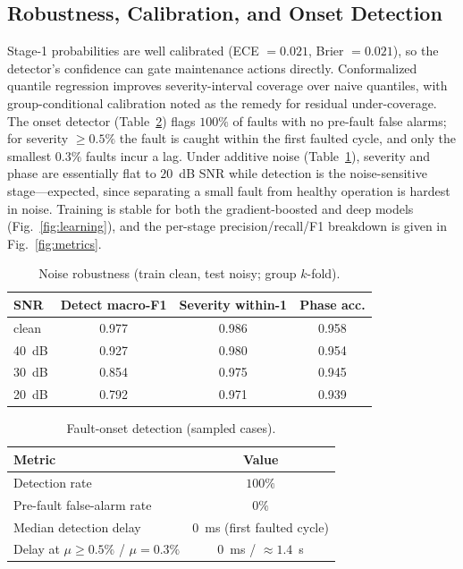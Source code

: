 \documentclass[journal]{IEEEtran}
\begin{document}
\subsection{Robustness, Calibration, and Onset Detection}
Stage-1 probabilities are well calibrated (ECE $=0.021$, Brier $=0.021$), so the detector's confidence
can gate maintenance actions directly. Conformalized quantile regression improves severity-interval
coverage over naive quantiles, with group-conditional calibration noted as the remedy for residual
under-coverage. The onset detector (Table~\ref{tab:onset}) flags $100\%$ of faults with no pre-fault
false alarms; for severity $\geq0.5\%$ the fault is caught within the first faulted cycle, and only the
smallest $0.3\%$ faults incur a lag. Under additive noise (Table~\ref{tab:noise}), severity and phase
are essentially flat to $20$~dB SNR while detection is the noise-sensitive stage---expected, since
separating a small fault from healthy operation is hardest in noise. Training is stable for both the
gradient-boosted and deep models (Fig.~\ref{fig:learning}), and the per-stage precision/recall/F1
breakdown is given in Fig.~\ref{fig:metrics}.

\begin{table}[!t]
\caption{Noise robustness (train clean, test noisy; group $k$-fold).}
\label{tab:noise}
\centering
\begin{tabular}{@{}lccc@{}}
\toprule
SNR & Detect macro-F1 & Severity within-1 & Phase acc. \\
\midrule
clean & 0.977 & 0.986 & 0.958 \\
40~dB & 0.927 & 0.980 & 0.954 \\
30~dB & 0.854 & 0.975 & 0.945 \\
20~dB & 0.792 & 0.971 & 0.939 \\
\bottomrule
\end{tabular}
\end{table}

\begin{table}[!t]
\caption{Fault-onset detection (sampled cases).}
\label{tab:onset}
\centering
\begin{tabular}{@{}lc@{}}
\toprule
Metric & Value \\
\midrule
Detection rate & $100\%$ \\
Pre-fault false-alarm rate & $0\%$ \\
Median detection delay & $0$~ms (first faulted cycle) \\
Delay at $\mu\geq0.5\%$ / $\mu=0.3\%$ & $0$~ms / $\approx1.4$~s \\
\bottomrule
\end{tabular}
\end{table}
\end{document}
